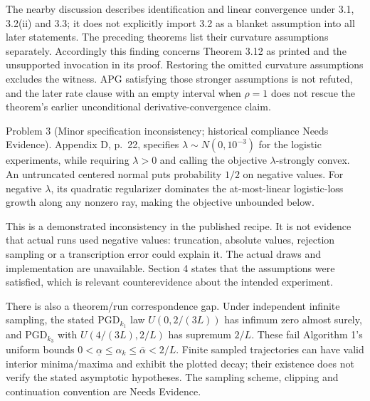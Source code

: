 \documentclass[10pt]{article}
\begin{document}
The nearby discussion describes identification and linear convergence under 3.1, 3.2(ii) and 3.3; it does not explicitly import 3.2 as a blanket assumption into all later statements. The preceding theorems list their curvature assumptions separately. Accordingly this finding concerns Theorem 3.12 as printed and the unsupported invocation in its proof. Restoring the omitted curvature assumptions excludes the witness. APG satisfying those stronger assumptions is not refuted, and the later rate clause with an empty interval when \(\rho=1\) does not rescue the theorem’s earlier unconditional derivative-convergence claim.\par
Problem 3 (Minor specification inconsistency; historical compliance Needs Evidence).  Appendix D, p. 22, specifies \(\lambda\sim N(0,10^{-3})\) for the logistic experiments, while requiring \(\lambda>0\) and calling the objective \(\lambda\)-strongly convex. An untruncated centered normal puts probability \(1/2\) on negative values. For negative \(\lambda\), its quadratic regularizer dominates the at-most-linear logistic-loss growth along any nonzero ray, making the objective unbounded below.\par
This is a demonstrated inconsistency in the published recipe. It is not evidence that actual runs used negative values: truncation, absolute values, rejection sampling or a transcription error could explain it. The actual draws and implementation are unavailable. Section 4 states that the assumptions were satisfied, which is relevant counterevidence about the intended experiment.\par
There is also a theorem/run correspondence gap. Under independent infinite sampling, the stated PGD\(_{k_1}\) law \(U(0,2/(3L))\) has infimum zero almost surely, and PGD\(_{k_3}\) with \(U(4/(3L),2/L)\) has supremum \(2/L\). These fail Algorithm 1’s uniform bounds \(0<\underline\alpha\le\alpha_k\le\bar\alpha<2/L\). Finite sampled trajectories can have valid interior minima/maxima and exhibit the plotted decay; their existence does not verify the stated asymptotic hypotheses. The sampling scheme, clipping and continuation convention are Needs Evidence.\par
\end{document}
